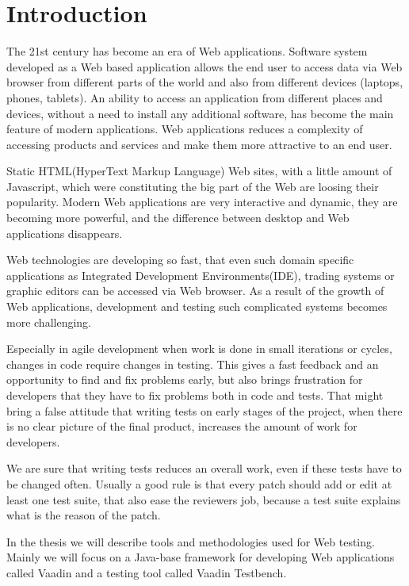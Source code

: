 	
	 \chapter{Introduction}
	 \label{ch:intro} 		
	The 21st century has become an era of Web applications. Software system
	developed as a Web based application allows the end user to access data via
	Web browser from different parts of the world and also from different devices
	(laptops, phones, tablets). An ability to access an application from different
	places and devices, without a need to install any additional software,
	has become the main feature of modern applications. Web applications reduces a
	complexity of accessing products and services and make them more attractive to an end
	user.
	
	Static HTML(HyperText Markup Language) Web sites, with a little amount of
	Javascript, which were constituting the big part of the Web are loosing their popularity.
	Modern Web	applications are very interactive and dynamic, they are becoming
	more powerful, and the difference between desktop and Web applications
	disappears. 
	
	Web technologies are developing so fast, that even such domain
	specific applications as Integrated Development Environments(IDE), trading
	systems or graphic editors can be accessed via Web browser. As a result of the
	growth of Web applications, development and testing such complicated
	systems becomes more challenging.
	
	Especially in agile development when work is done in small iterations or
	cycles, changes in code require changes in testing. This gives a fast feedback and
 an opportunity to find and fix problems early, but also brings frustration
for developers that they have to fix problems both in code and tests. 
That might bring a false attitude that writing tests on early stages of the project,
 when there is no clear picture of the final product,
 increases the amount of work for developers. 
 
 We are sure that writing tests reduces an overall work,
 even if these tests have to be changed often. Usually a good rule is that
 every patch should add or edit at least one test suite, that also ease the reviewers job,
  because a test suite explains what is the reason of the patch.
	
	In the thesis we will describe tools and methodologies used for Web testing.
	Mainly we will focus on a Java-base framework for developing Web applications
	called Vaadin and a testing tool called Vaadin Testbench.
	
